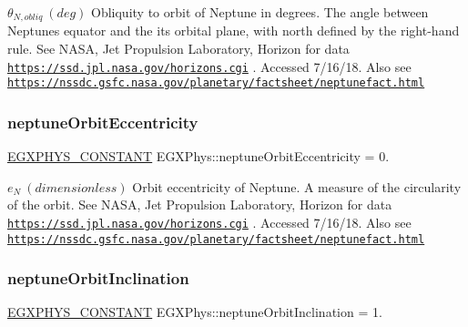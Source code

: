 $ \theta_{N,obliq} \ (deg)$ Obliquity to orbit of Neptune in degrees. The angle between Neptune\textquotesingle{}s equator and the it\textquotesingle{}s orbital plane, with north defined by the right-\/hand rule. See N\+A\+SA, Jet Propulsion Laboratory, Horizon for data \href{https://ssd.jpl.nasa.gov/horizons.cgi}{\tt https\+://ssd.\+jpl.\+nasa.\+gov/horizons.\+cgi} . Accessed 7/16/18. Also see \href{https://nssdc.gsfc.nasa.gov/planetary/factsheet/neptunefact.html}{\tt https\+://nssdc.\+gsfc.\+nasa.\+gov/planetary/factsheet/neptunefact.\+html} \mbox{\label{group___e_g_x_phys-_constants-_astrophysics-_solar_system-_neptune-_orbit_gab3e9b205b862cf41dbaa8c295d195205}} 
\subsubsection{\texorpdfstring{neptune\+Orbit\+Eccentricity}{neptuneOrbitEccentricity}}
{\footnotesize\ttfamily \mbox{\hyperlink{group___e_g_x_phys-_constants-_macros_ga76980d288494ce1714c9ac68a95ba702}{E\+G\+X\+P\+H\+Y\+S\+\_\+\+C\+O\+N\+S\+T\+A\+NT}} E\+G\+X\+Phys\+::neptune\+Orbit\+Eccentricity = 0.}

$ e_{N} \ (dimensionless)$ Orbit eccentricity of Neptune. A measure of the circularity of the orbit. See N\+A\+SA, Jet Propulsion Laboratory, Horizon for data \href{https://ssd.jpl.nasa.gov/horizons.cgi}{\tt https\+://ssd.\+jpl.\+nasa.\+gov/horizons.\+cgi} . Accessed 7/16/18. Also see \href{https://nssdc.gsfc.nasa.gov/planetary/factsheet/neptunefact.html}{\tt https\+://nssdc.\+gsfc.\+nasa.\+gov/planetary/factsheet/neptunefact.\+html} \mbox{\label{group___e_g_x_phys-_constants-_astrophysics-_solar_system-_neptune-_orbit_ga0e7986e30442e02c442555d4b76cb0f6}} 
\subsubsection{\texorpdfstring{neptune\+Orbit\+Inclination}{neptuneOrbitInclination}}
{\footnotesize\ttfamily \mbox{\hyperlink{group___e_g_x_phys-_constants-_macros_ga76980d288494ce1714c9ac68a95ba702}{E\+G\+X\+P\+H\+Y\+S\+\_\+\+C\+O\+N\+S\+T\+A\+NT}} E\+G\+X\+Phys\+::neptune\+Orbit\+Inclination = 1.}

